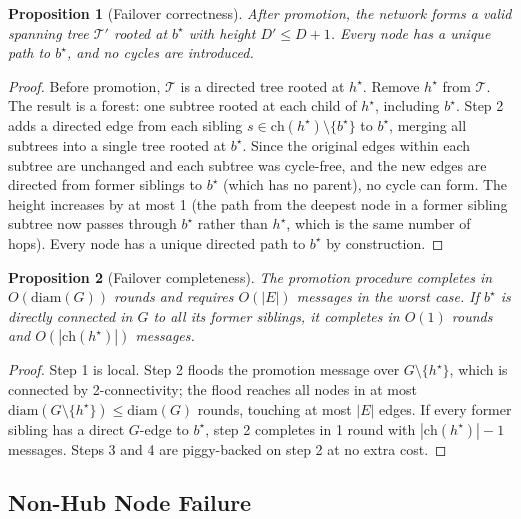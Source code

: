 \documentclass{article}
\newtheorem{proposition}{Proposition}
\begin{document}
\begin{proposition}[Failover correctness]
\label{prop:failover}
    After promotion, the network forms a valid spanning tree $\mathcal{T}'$ rooted at
    $b^\star$ with height $D' \leq D + 1$. Every node has a unique path to $b^\star$,
    and no cycles are introduced.
\end{proposition}

\begin{proof}
    Before promotion, $\mathcal{T}$ is a directed tree rooted at $h^\star$. Remove
    $h^\star$ from $\mathcal{T}$. The result is a forest: one subtree rooted at each
    child of $h^\star$, including $b^\star$. Step 2 adds a directed edge from each
    sibling $s \in \mathrm{ch}(h^\star) \setminus \{b^\star\}$ to $b^\star$, merging
    all subtrees into a single tree rooted at $b^\star$. Since the original edges within
    each subtree are unchanged and each subtree was cycle-free, and the new edges are
    directed from former siblings to $b^\star$ (which has no parent), no cycle can form.
    The height increases by at most 1 (the path from the deepest node in a former sibling
    subtree now passes through $b^\star$ rather than $h^\star$, which is the same number
    of hops). Every node has a unique directed path to $b^\star$ by construction.
\end{proof}

\begin{proposition}[Failover completeness]
\label{prop:completeness}
    The promotion procedure completes in $O(\mathrm{diam}(G))$ rounds and requires
    $O(|E|)$ messages in the worst case. If $b^\star$ is directly connected in $G$ to
    all its former siblings, it completes in $O(1)$ rounds and $O(|\mathrm{ch}(h^\star)|)$
    messages.
\end{proposition}

\begin{proof}
    Step 1 is local. Step 2 floods the promotion message over $G \setminus \{h^\star\}$,
    which is connected by 2-connectivity; the flood reaches all nodes in at most
    $\mathrm{diam}(G \setminus \{h^\star\}) \leq \mathrm{diam}(G)$ rounds, touching at
    most $|E|$ edges. If every former sibling has a direct $G$-edge to $b^\star$, step 2
    completes in 1 round with $|\mathrm{ch}(h^\star)| - 1$ messages. Steps 3 and 4 are
    piggy-backed on step 2 at no extra cost.
\end{proof}

\subsection{Non-Hub Node Failure}
\label{sec:nonhub}
\end{document}
